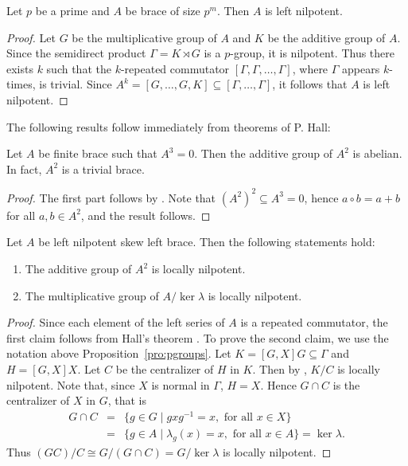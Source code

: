 \begin{proposition}
    \label{pro:pgroups}
    Let $p$ be a prime and $A$ be brace of size $p^m$. Then $A$ is
    left nilpotent.
\end{proposition}

\begin{proof}
    Let $G$ be the multiplicative group of $A$ and $K$ be the additive group of
    $A$. Since the semidirect product $\Gamma=K\rtimes G$ is a $p$-group, it is
    nilpotent. Thus there exists $k$ such that the $k$-repeated commutator
    $[\Gamma,\Gamma,\dots,\Gamma]$, where $\Gamma$ appears $k$-times, is trivial. Since
    $A^k=[G,\dots,G,K]\subseteq [\Gamma,\dots,\Gamma]$, 
    it follows that $A$ is left nilpotent.
\end{proof}

The following results follow immediately from theorems of P.  Hall:

\begin{lemma}
    Let $A$ be finite brace such that $A^3=0$. Then the additive group of
    $A^2$ is abelian. In fact, $A^2$ is a trivial brace.
\end{lemma}

\begin{proof}
The first part follows by \cite[Theorem~6]{Hall}. Note that
$(A^2)^2\subseteq A^3=0$, hence $a\circ b=a+b$ for all $a,b\in A^2$, and
the result follows.
\end{proof}


\begin{theorem}
    \label{thm:A2}
    Let $A$ be left nilpotent skew left brace. Then the following statements
    hold:
    \begin{enumerate}
        \item The additive group of $A^2$ is locally nilpotent.
        \item The multiplicative group of $A/\ker\lambda$ is locally nilpotent.
    \end{enumerate}
\end{theorem}

\begin{proof}
    Since each element of the left series of $A$ is a repeated commutator, the
    first claim follows from Hall's theorem \cite[Theorem~4]{Hall}.
    To prove the second claim, we use the notation above
    Proposition~\ref{pro:pgroups}. Let $K=[G,X]G\subseteq \Gamma$ and
    $H=[G,X]X$. Let $C$ be the centralizer of $H$ in $K$. Then by
    \cite[Theorem~4]{Hall}, $K/C$ is locally nilpotent. Note
    that, since $X$ is normal in $\Gamma$, $H=X$. Hence $G\cap C$ is the
    centralizer of $X$ in $G$, that is
    \begin{eqnarray*}G\cap C&=&\{ g\in G\mid gxg^{-1}=x, \text{ for all } x\in X\}\\
    &=&\{ g\in A\mid \lambda_g(x)=x, \text{ for all } x\in A\}=\ker\lambda.
    \end{eqnarray*}
     Thus $(GC)/C\cong G/(G\cap
     C)=G/\ker\lambda$ is locally nilpotent.
\end{proof}


